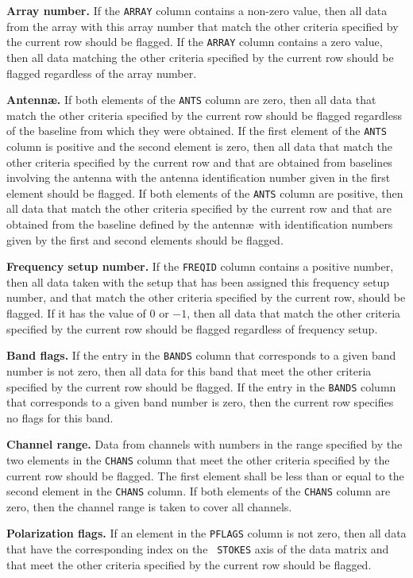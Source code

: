 \documentclass[twoside]{article}
\newcommand{\Hi}[1]{\textcolor{hicol}{#1}}
\begin{document}
{\bf Array number.}  If the {\tt ARRAY} column contains a non-zero
value, then all data from the array with this array number that match
the other criteria specified by the current row should be flagged.
\Hi{If the {\tt ARRAY} column contains a zero value,} then all data
matching the other criteria specified by the current row should be
flagged regardless of the array number.

{\bf Antenn\ae.}  If both elements of the {\tt ANTS} column are zero,
then all data that match the other criteria specified by the current
row should be flagged regardless of the baseline from which they were
obtained.  If the first element \Hi{of the {\tt ANTS} column} is
positive and the second element is zero, then all data that match the
other criteria specified by the current row and that are obtained from
baselines involving the antenna with the antenna identification number
given in the first element should be flagged.  If both elements \Hi{of
  the {\tt ANTS} column} are positive, then all data that match the
other criteria specified by the current row and that are obtained from
the baseline defined by the antenn\ae\ with identification numbers given
by the first and second elements should be flagged.

{\bf Frequency setup number.}  If the {\tt FREQID} column contains a
positive number, then all data taken with the setup that has been
assigned this frequency setup number, and that match the other criteria
specified by the current row, should be flagged.  If it has the value
of 0 or $-1$, then all data that match the other criteria specified by
the current row should be flagged regardless of frequency setup.

{\bf Band flags.}  If the entry in the {\tt BANDS} column that
corresponds to a given band number is not zero, then all data for this
band that meet the other criteria specified by the current row should
be flagged.  If the entry \Hi{in the {\tt BANDS} column that
  corresponds to a given band number} is zero, then the current row
specifies no flags for this band.


{\bf Channel range.}  Data from channels with numbers in the range
specified by the two elements in the {\tt CHANS} column that meet the
other criteria specified by the current row should be flagged.  The
first element shall be less than or equal to the second element \Hi{in
the {\tt CHANS} column}.  If both elements of the {\tt CHANS} column
are zero, then the channel range is taken to cover all channels.

{\bf Polarization flags.}  If an element in the {\tt PFLAGS} column is
not zero, then all data that have the corresponding index on the {\tt
  STOKES} axis of the data matrix and that meet the other criteria
specified by the current row should be flagged.
\end{document}
